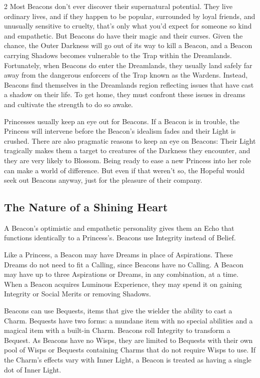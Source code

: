 \begin{multicols}{2}
Most Beacons don’t ever discover their supernatural potential. They live ordinary lives, and if they happen to be popular, surrounded by loyal friends, and unusually sensitive to cruelty, that’s only what you'd expect for someone so kind and empathetic. But Beacons do have their magic and their curses. Given the chance, the Outer Darkness will go out of its way to kill a Beacon, and a Beacon carrying Shadows becomes vulnerable to the Trap within the Dreamlands. Fortunately, when Beacons do enter the Dreamlands, they usually land safely far away from the dangerous enforcers of the Trap known as the Wardens. Instead, Beacons find themselves in the Dreamlands region reflecting issues that have cast a shadow on their life. To get home, they must confront these issues in dreams and cultivate the strength to do so awake. 

Princesses usually keep an eye out for Beacons. If a Beacon is in trouble, the Princess will intervene before the Beacon’s idealism fades and their Light is crushed. There are also pragmatic reasons to keep an eye on Beacons: Their Light tragically makes them a target to creatures of the Darkness they encounter, and they are very likely to Blossom. Being ready to ease a new Princess into her role can make a world of difference. But even if that weren’t so, the Hopeful would seek out Beacons anyway, just for the pleasure of their company.


\subsection*{The Nature of a Shining Heart}

A Beacon's optimistic and empathetic personality gives them an Echo that functions identically to a Princess's. Beacons use Integrity instead of Belief.

Like a Princess, a Beacon may have Dreams in place of Aspirations. These Dreams do not need to fit a Calling, since Beacons have no Calling. A Beacon may have up to three Aspirations or Dreams, in any combination, at a time. When a Beacon acquires Luminous Experience, they may spend it on gaining Integrity or Social Merits or removing Shadows.

Beacons can use Bequests, items that give the wielder the ability to cast a Charm. Bequests have two forms: a mundane item with no special abilities and a magical item with a built-in Charm. Beacons roll Integrity to transform a Bequest. As Beacons have no Wisps, they are limited to Bequests with their own pool of Wisps or Bequests containing Charms that do not require Wisps to use. If the Charm's effects vary with Inner Light, a Beacon is treated as having a single dot of Inner Light.


\end{multicols}
